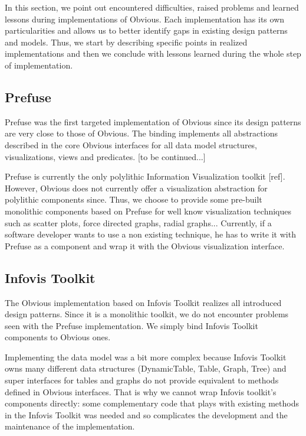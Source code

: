 In this section, we point out encountered difficulties, raised
problems and learned lessons during implementations of Obvious. Each
implementation has its own particularities and allows us to better
identify gaps in existing design patterns and models. Thus, we start
by describing specific points in realized implementations and
then we conclude with lessons learned during the whole step of
implementation.

\subsection{Prefuse}

Prefuse was the first targeted implementation of Obvious since its design patterns are very close to those of Obvious.  The binding implements all abstractions described in the core Obvious interfaces for all data model structures, visualizations, views and predicates. [to be continued...]

Prefuse is currently the only polylithic Information Visualization toolkit [ref]. However, Obvious does not currently offer a visualization abstraction for polylithic components since. Thus, we choose to provide some pre-built monolithic components based on Prefuse for well know visualization techniques such as scatter plots, force directed graphs, radial graphs... Currently, if a software developer wants to use a non existing technique, he has to write it with Prefuse as a component and wrap it with the Obvious visualization interface.

\subsection{Infovis Toolkit}

The Obvious implementation based on Infovis Toolkit realizes all introduced design patterns. Since it is a monolithic toolkit, we do not encounter problems seen with the Prefuse implementation. We simply bind Infovis Toolkit components to Obvious ones.

Implementing the data model was a bit more complex because Infovis Toolkit owns many different data structures (DynamicTable, Table, Graph, Tree) and super interfaces for tables and graphs do not provide equivalent to methods defined in Obvious interfaces. That is why we cannot wrap Infovis toolkit's components directly: some complementary code that plays with existing methods in the Infovis Toolkit was needed and so complicates the development and the maintenance of the implementation.


